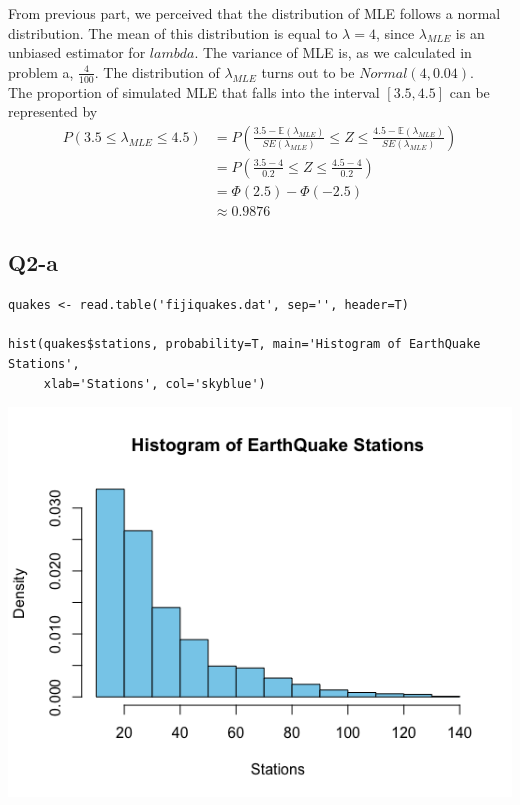 \documentclass[12pt,letterpaper]{article}
\begin{document}
\noindent From previous part, we perceived that the distribution of MLE follows a normal distribution. The mean of this distribution is equal to $\lambda = 4$, since $\lambda_{MLE}$ is an unbiased estimator for $lambda$. The variance of MLE is, as we calculated in problem a, $\frac{4}{100}$. The distribution of $\lambda_{MLE}$ turns out to be $Normal(4, 0.04)$.\\

\noindent The proportion of simulated MLE that falls into the interval $[3.5, 4.5]$ can be represented by 
\begin{align*}
P(3.5 \leq \lambda_{MLE} \leq 4.5) &= P(\frac{3.5 - \mathbb{E}(\lambda_{MLE})}{SE(\lambda_{MLE})} \leq Z \leq \frac{4.5 - \mathbb{E}(\lambda_{MLE})}{SE(\lambda_{MLE})}) \\
&= P(\frac{3.5-4}{0.2} \leq Z \leq \frac{4.5-4}{0.2}) \\
&= \Phi(2.5) - \Phi(-2.5) \\
&\approx 0.9876
\end{align*}

\newpage
\subsection*{Q2-a}
\begin{verbatim}
quakes <- read.table('fijiquakes.dat', sep='', header=T)

hist(quakes$stations, probability=T, main='Histogram of EarthQuake Stations',
     xlab='Stations', col='skyblue')
\end{verbatim}

\includegraphics[width=150mm]{hist_station.png}
\end{document}
